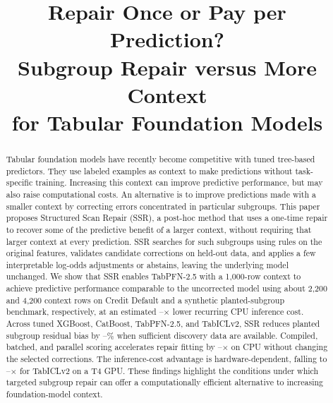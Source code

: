 \documentclass[conference]{IEEEtran}
\begin{document}

\title{Repair Once or Pay per Prediction?\\Subgroup Repair versus More Context\\for Tabular Foundation Models}

\author{
}

\maketitle

\begin{abstract}
Tabular foundation models have recently become competitive with tuned tree-based predictors. They
use labeled examples as context to make predictions without task-specific training. Increasing this
context can improve predictive performance, but may also raise computational costs. An alternative is
to improve predictions made with a smaller context by correcting errors concentrated in particular
subgroups. This paper proposes Structured Scan Repair (SSR), a post-hoc method that uses a one-time
repair to recover some of the predictive benefit of a larger context, without requiring that larger
context at every prediction. SSR searches for such subgroups using rules on the original features,
validates candidate corrections on held-out data, and applies a few interpretable log-odds
adjustments or abstains, leaving the underlying model unchanged. We show that SSR enables TabPFN-2.5
with a 1{,}000-row context to achieve predictive performance comparable to the uncorrected model
using about 2{,}200 and 4{,}200 context rows on Credit Default and a synthetic planted-subgroup
benchmark, respectively, at an estimated \CrEqScanCpu--\PlEqScanCpu$\times$ lower recurring CPU
inference cost. Across tuned XGBoost, CatBoost, TabPFN-2.5, and TabICLv2, SSR reduces planted
subgroup residual bias by \DBiasRedLo--\DBiasRedHi\% when sufficient discovery data are available.
Compiled, batched, and parallel scoring accelerates repair fitting by \SpBatMin--\SpBatMax$\times$
on CPU without changing the selected corrections. The inference-cost advantage is hardware-dependent,
falling to \IclCrEqScanGpu--\IclPlEqScanGpu$\times$ for TabICLv2 on a T4 GPU. These findings
highlight the conditions under which targeted subgroup repair can offer a computationally efficient
alternative to increasing foundation-model context.
\end{abstract}
\end{document}
